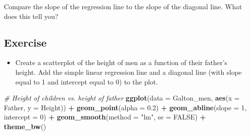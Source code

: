 \documentclass[
]{book}
\newenvironment{Shaded}{\begin{snugshade}}{\end{snugshade}}
\newcommand{\CommentTok}[1]{\textcolor[rgb]{0.56,0.35,0.01}{\textit{#1}}}
\newcommand{\DataTypeTok}[1]{\textcolor[rgb]{0.13,0.29,0.53}{#1}}
\newcommand{\DecValTok}[1]{\textcolor[rgb]{0.00,0.00,0.81}{#1}}
\newcommand{\FloatTok}[1]{\textcolor[rgb]{0.00,0.00,0.81}{#1}}
\newcommand{\KeywordTok}[1]{\textcolor[rgb]{0.13,0.29,0.53}{\textbf{#1}}}
\newcommand{\NormalTok}[1]{#1}
\newcommand{\OperatorTok}[1]{\textcolor[rgb]{0.81,0.36,0.00}{\textbf{#1}}}
\newcommand{\OtherTok}[1]{\textcolor[rgb]{0.56,0.35,0.01}{#1}}
\newcommand{\StringTok}[1]{\textcolor[rgb]{0.31,0.60,0.02}{#1}}
\providecommand{\tightlist}{%
  \setlength{\itemsep}{0pt}\setlength{\parskip}{0pt}}
\begin{document}
\begin{Shaded}
\end{Shaded}

Compare the slope of the regression line to the slope of the diagonal line. What does this tell you?

\hypertarget{exercise-9}{%
\subsection*{Exercise}\label{exercise-9}}

\begin{itemize}
\tightlist
\item
  Create a scatterplot of the height of men as a function of their father's height. Add the simple linear regression line and a diagonal line (with slope equal to 1 and intercept equal to 0) to the plot.
\end{itemize}

\begin{Shaded}
\begin{Highlighting}[]
\CommentTok{# Height of children vs. height of father}
\KeywordTok{ggplot}\NormalTok{(}\DataTypeTok{data =}\NormalTok{ Galton_men, }\KeywordTok{aes}\NormalTok{(}\DataTypeTok{x =}\NormalTok{ Father, }\DataTypeTok{y =}\NormalTok{ Height)) }\OperatorTok{+}
\StringTok{  }\KeywordTok{geom_point}\NormalTok{(}\DataTypeTok{alpha =} \FloatTok{0.2}\NormalTok{) }\OperatorTok{+}\StringTok{ }
\StringTok{  }\KeywordTok{geom_abline}\NormalTok{(}\DataTypeTok{slope =} \DecValTok{1}\NormalTok{, }\DataTypeTok{intercept =} \DecValTok{0}\NormalTok{) }\OperatorTok{+}\StringTok{ }
\StringTok{  }\KeywordTok{geom_smooth}\NormalTok{(}\DataTypeTok{method =} \StringTok{"lm"}\NormalTok{, }\DataTypeTok{se =} \OtherTok{FALSE}\NormalTok{) }\OperatorTok{+}\StringTok{ }
\StringTok{  }\KeywordTok{theme_bw}\NormalTok{()}
\end{Highlighting}
\end{Shaded}
\end{document}
